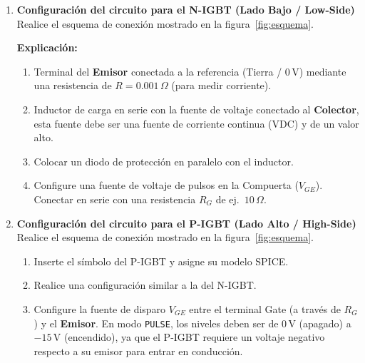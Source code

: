\documentclass[12pt,a4paper]{article}
\begin{document}
\begin{enumerate}
  \item \textbf{Configuración del circuito para el N-IGBT (Lado Bajo / Low-Side)}\\
        Realice el esquema de conexión mostrado en la figura~\ref{fig:esquema}.

        \textbf{Explicación:}
        \begin{enumerate}
          \item Terminal del \textbf{Emisor} conectada a la referencia (Tierra / 0\,V)
                mediante una resistencia de $R = 0.001\,\Omega$ (para medir
                corriente).
          \item Inductor de carga en serie con la fuente de voltaje conectado
                al \textbf{Colector}, esta fuente debe ser una fuente de corriente
                continua (VDC) y de un valor alto.
          \item Colocar un diodo de protección en paralelo con el inductor.
          \item Configure una fuente de voltaje de pulsos en la Compuerta
                ($V_{GE}$). Conectar en serie con una resistencia $R_G$ de
                ej.\ $10\,\Omega$.
        \end{enumerate}

  \item \textbf{Configuración del circuito para el P-IGBT (Lado Alto / High-Side)}\\
        Realice el esquema de conexión mostrado en la figura~\ref{fig:esquema}.
        \begin{enumerate}
          \item Inserte el símbolo del P-IGBT y asigne su modelo SPICE.
          \item Realice una configuración similar a la del N-IGBT.
          \item Configure la fuente de disparo $V_{GE}$ entre el terminal Gate
                (a través de $R_G$) y el \textbf{Emisor}. En modo \texttt{PULSE}, los niveles
                deben ser de 0\,V (apagado) a $-15$\,V (encendido), ya que el
                P-IGBT requiere un voltaje negativo respecto a su emisor para
                entrar en conducción.
        \end{enumerate}


\end{enumerate}
\end{document}
